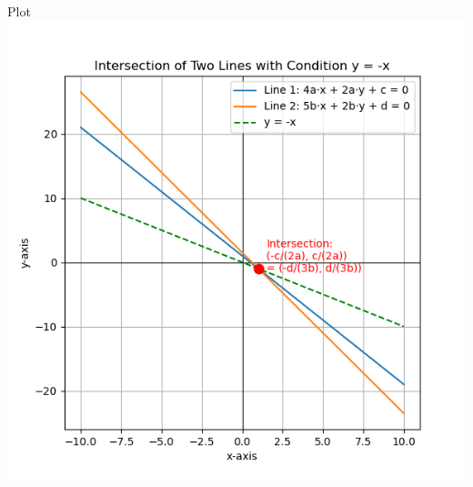 \documentclass{beamer}
\begin{document}
\begin{frame}{Plot}
    \centering
    \includegraphics[width=3\columnwidth, height=0.8\textheight, keepaspectratio]{figs/fig.png}     
\end{frame}
\end{document}
